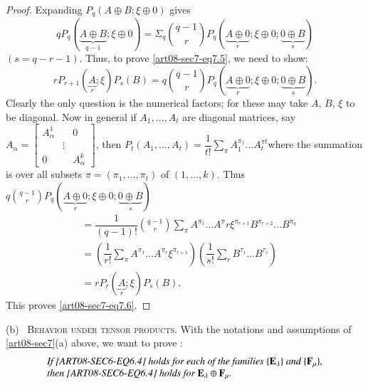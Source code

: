 \begin{proof}
Expanding $P_{q}(A\oplus B;\xi\oplus 0)$ gives
$$
qP_{q}(\underbrace{A\oplus B}_{q-1};\xi\oplus 0)=\Sigma_{q}\binom{q-1}{r}P_{q}(\underbrace{A\oplus 0}_{r};\xi\oplus 0;\underbrace{0\oplus B}_{s})
$$
$(s=q-r-1)$. Thus, to prove \eqref{art08-sec7-eq7.5}, we need to show:
\begin{equation}
rP_{r+1}(\underbrace{A}_{r};\xi)P_{s}(B)=q\binom{q-1}{r}P_{q}(\underbrace{A\oplus 0}_{r};\xi\oplus 0; \underbrace{0\oplus B}_{s}).\label{art08-sec7-eq7.6}
\end{equation}
Clearly the only question is the numerical factors; for these may take $A$, $B$, $\xi$ to be diagonal. Now in general if $A_{1},\ldots,A_{t}$ are diagonal matrices, say $A_{\alpha}=\left[\begin{smallmatrix} A^{1}_{\alpha} & & 0\\ & \vdots & \\ 0 & & A^{k}_{\alpha}\end{smallmatrix}\right]$, then $P_{t}(A_{1},\ldots,A_{t})=\dfrac{1}{t!}\sum\limits_{\pi}A^{\pi_{1}}_{1}\ldots A^{\pi t}_{t}$\pageoriginale where the summation is over all subsets $\pi=(\pi_{1},\ldots,\pi_{t})$ of $(1,\ldots,k)$. Thus $q\binom{q-1}{r}P_{q}(\underbrace{A\oplus 0}_{r};\xi\oplus 0; \underbrace{0\oplus B}_{s})$
\begin{align*}
&= \dfrac{1}{(q-1)!}\binom{q-1}{r}\sum\limits_{\pi}A^{\pi_{1}}\ldots A^{\pi}r\xi^{\pi_{r+1}}B^{\pi_{r+2}}\ldots B^{\pi_{q}}\\[3pt]
&= \left(\dfrac{1}{r!}\sum\limits_{\pi}A^{\pi_{1}}\ldots A^{\pi_{r}}\xi^{\pi_{r+1}}\right)\left(\dfrac{1}{s!}\sum\limits_{r}B^{\tau_{1}}\ldots B^{\tau_{s}}\right)\\[3pt]
&= rP_{r}(\underbrace{A}_{r};\xi)P_{s}(B).
\end{align*}
This proves \eqref{art08-sec7-eq7.6}.
\end{proof}

(b)~ \textsc{Behavior under tensor products.} With the notations and assumptions of \ref{art08-sec7}(a) above, we want to prove :
\begin{equation}
\begin{array}{l}
\text{\em If \eqref{ART08-SEC6-EQ6.4} holds for each of the families $\{\mathbf{E}_{\lambda}\}$ and $\{\mathbf{F}_{\mu}\}$,}\\
\text{\em then \eqref{ART08-SEC6-EQ6.4} holds for $\mathbf{E}_{\lambda}\oplus \mathbf{F}_{\mu}$.}
\end{array}\label{art08-sec7-eq7.7}
\end{equation}

